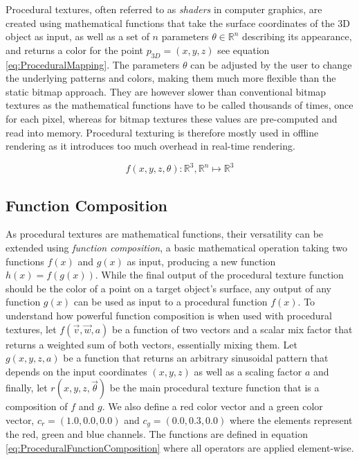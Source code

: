 Procedural textures, often referred to as \textit{shaders} in computer graphics, are created using mathematical functions that take the surface coordinates of the 3D object as input, as well as a set of $n$ parameters $\theta \in \mathbb{R}^n$ describing its appearance, and returns a color for the point $p_{3D} = (x,y,z)$ see equation \ref{eq:ProceduralMapping}. The parameters $\theta$ can be adjusted by the user to change the underlying patterns and colors, making them much more flexible than the static bitmap approach. They are however slower than conventional bitmap textures as the mathematical functions have to be called thousands of times, once for each pixel, whereas for bitmap textures these values are pre-computed and read into memory. Procedural texturing is therefore mostly used in offline rendering as it introduces too much overhead in real-time rendering.

\begin{equation}\label{eq:ProceduralMapping}
    f(x,y,z,\theta): \mathbb{R}^3, \mathbb{R}^n \mapsto \mathbb{R}^3
\end{equation}


\subsection{Function Composition}

As procedural textures are mathematical functions, their versatility can be extended using \textit{function composition}, a basic mathematical operation taking two functions $f(x)$ and $g(x)$ as input, producing a new function $h(x) = f(g(x))$. While the final output of the procedural texture function should be the color of a point on a target object's surface, any output of any function $g(x)$ can be used as input to a procedural function $f(x)$. To understand how powerful function composition is when used with procedural textures, let $f(\vec{v}, \vec{w}, a)$ be a function of two vectors and a scalar mix factor that returns a weighted sum of both vectors, essentially mixing them. Let $g(x,y,z,a)$ be a function that returns an arbitrary sinusoidal pattern that depends on the input coordinates $(x,y,z)$ as well as a scaling factor $a$ and finally, let $r(x,y,z,\vec{\theta})$ be the main procedural texture function that is a composition of $f$ and $g$. We also define a red color vector and a green color vector, $c_r = (1.0,0.0,0.0)$ and $c_g = (0.0,0.3,0.0)$ where the elements represent the red, green and blue channels. The functions are defined in equation \ref{eq:ProceduralFunctionComposition} where all operators are applied element-wise.

